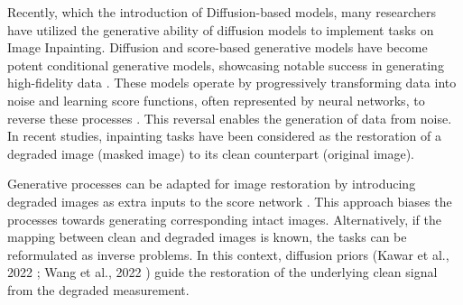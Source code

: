 

Recently, which the introduction of Diffusion-based models, many researchers have utilized the generative ability of diffusion models to implement tasks on Image Inpainting. Diffusion and score-based generative models \cite{sohl2015deep} \cite{song2020score} have become potent conditional generative models, showcasing notable success in generating high-fidelity data \cite{dhariwal2021diffusion} \cite{rombach2022high} \cite{vahdat2021score}. These models operate by progressively transforming data into noise and learning score functions, often represented by neural networks, to reverse these processes \cite{anderson1982reverse}. This reversal enables the generation of data from noise. In recent studies, inpainting tasks have been considered as the restoration of a degraded image (masked image) to its clean counterpart (original image).

Generative processes can be adapted for image restoration by introducing degraded images as extra inputs to the score network \cite{saharia2022image} \cite{saharia2022palette}. This approach biases the processes towards generating corresponding intact images. Alternatively, if the mapping between clean and degraded images is known, the tasks can be reformulated as inverse problems. In this context, diffusion priors (Kawar et al., 2022 \cite{zhu2023denoising}; Wang et al., 2022 \cite{wang2022zero}) guide the restoration of the underlying clean signal from the degraded measurement.

